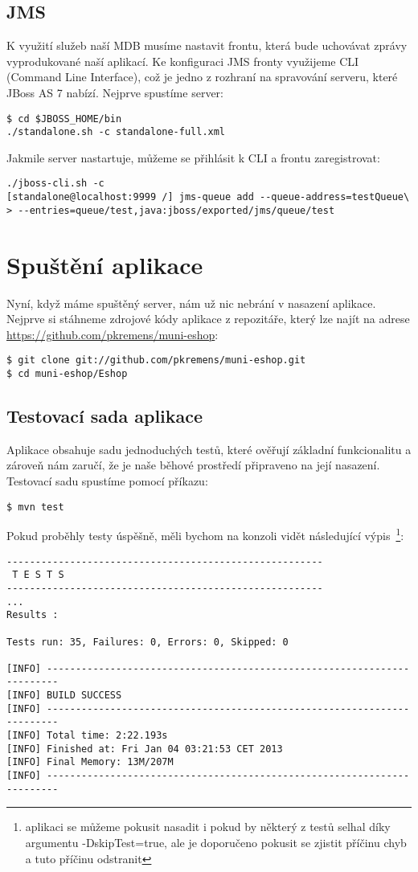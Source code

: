 \documentclass[122pt,oneside]{fithesis}
\begin{document}
\subsection{JMS}
K využití služeb naší MDB musíme nastavit frontu, která bude uchovávat zprávy vyprodukované naší aplikací. Ke konfiguraci JMS fronty využijeme CLI (Command Line Interface), což je jedno z rozhraní na spravování serveru, které JBoss AS 7 nabízí. Nejprve spustíme server:
\begin{lstlisting}
$ cd $JBOSS_HOME/bin
./standalone.sh -c standalone-full.xml
\end{lstlisting}
Jakmile server nastartuje, můžeme se přihlásit k CLI a frontu zaregistrovat:
\begin{lstlisting}
./jboss-cli.sh -c
[standalone@localhost:9999 /] jms-queue add --queue-address=testQueue\
> --entries=queue/test,java:jboss/exported/jms/queue/test
\end{lstlisting}

\section{Spuštění aplikace}
Nyní, když máme spuštěný server, nám už nic nebrání v nasazení aplikace. Nejprve si stáhneme zdrojové kódy aplikace z repozitáře, který lze najít na adrese \href{https://github.com/pkremens/muni-eshop}{https://github.com/pkremens/muni-eshop}:
\begin{lstlisting}
$ git clone git://github.com/pkremens/muni-eshop.git
$ cd muni-eshop/Eshop
\end{lstlisting}

\subsection{Testovací sada aplikace}
Aplikace obsahuje sadu jednoduchých testů, které ověřují základní funkcionalitu a zároveň nám zaručí, že je naše běhové prostředí připraveno na její nasazení. 
Testovací sadu spustíme pomocí příkazu:
\begin{lstlisting}
$ mvn test
\end{lstlisting}
Pokud proběhly testy úspěšně, měli bychom na konzoli vidět následující výpis~\footnote{aplikaci se můžeme pokusit nasadit i pokud by některý z testů selhal díky argumentu -DskipTest=true, ale je doporučeno pokusit se zjistit příčinu chyb a tuto příčinu odstranit}:
\begin{lstlisting}
-------------------------------------------------------
 T E S T S
-------------------------------------------------------
...
Results :

Tests run: 35, Failures: 0, Errors: 0, Skipped: 0

[INFO] ------------------------------------------------------------------------
[INFO] BUILD SUCCESS
[INFO] ------------------------------------------------------------------------
[INFO] Total time: 2:22.193s
[INFO] Finished at: Fri Jan 04 03:21:53 CET 2013
[INFO] Final Memory: 13M/207M
[INFO] ------------------------------------------------------------------------
\end{lstlisting}
\end{document}
